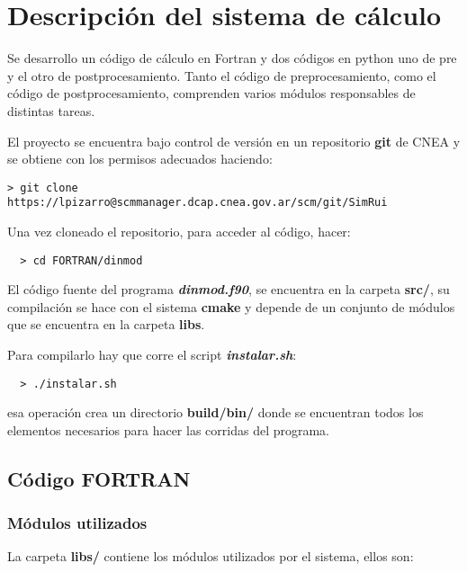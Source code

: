 

\section{Descripci\'on del sistema de c\'alculo}


Se desarrollo un c\'odigo de c\'alculo en Fortran y dos c\'odigos
en python uno  de pre y el otro de postprocesamiento. Tanto el código de 
preprocesamiento, 
como el código de postprocesamiento, comprenden varios módulos responsables de distintas
tareas.

El proyecto se encuentra bajo control de versión en un repositorio \textbf{git} de CNEA
y se obtiene con los permisos adecuados haciendo:

\begin{verbatim}
> git clone https://lpizarro@scmmanager.dcap.cnea.gov.ar/scm/git/SimRui
\end{verbatim}


Una vez cloneado el repositorio, para acceder al código, hacer:

\begin{verbatim}
  > cd FORTRAN/dinmod
\end{verbatim}



El c\'odigo fuente del programa \textbf{\textit{dinmod.f90}}, se encuentra en la carpeta
\textbf{src/}, su compilación se hace con el sistema \textbf{cmake} y depende
de un conjunto de módulos que se encuentra en la carpeta \textbf{libs}.

Para compilarlo hay que corre el script \textbf{\textit{instalar.sh}}:

\begin{verbatim}
  > ./instalar.sh 
\end{verbatim}

esa operación crea un directorio  \textbf{build/bin/} donde se encuentran todos
los elementos necesarios para hacer las corridas del programa.

\subsection{Código FORTRAN}


\subsubsection{Módulos  utilizados}

La carpeta \textbf{libs/} contiene los módulos utilizados por el sistema, ellos son:

